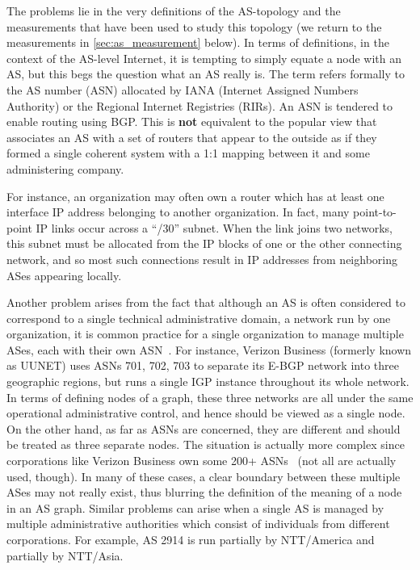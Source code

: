 The problems lie in the very definitions of the AS-topology and the
measurements that have been used to study this topology (we return to
the measurements in \autoref{sec:as_measurement} below).  In terms of
definitions, in the context of the AS-level Internet, it is tempting
to simply equate a node with an AS, but this begs the question what an
AS really is.  The term refers formally to the AS number (ASN)
allocated by IANA (Internet Assigned Numbers Authority) or the
Regional Internet Registries (RIRs). An ASN is tendered to enable
routing using BGP.  This is {\bf not} equivalent to the popular view
that associates an AS with a set of routers that appear to the outside
as if they formed a single coherent system with a 1:1 mapping between
it and some administering company.

For instance, an organization may often own a router which has at least one 
interface IP address belonging to another organization. In fact, many point-to-point 
IP links occur across a ``/30'' subnet. When the link joins two networks, this subnet 
must be allocated from the IP blocks of one or the other connecting network, and so 
most such connections result in IP addresses from neighboring ASes appearing locally. 

Another problem arises from the fact that although an AS is often considered to 
correspond to a single technical administrative domain, \ie a network run by one 
organization, it is common practice for a single organization to manage multiple 
ASes, each with their own ASN~\cite{cai10:_AS_to_organ_map}. For instance, Verizon 
Business (formerly known as UUNET) uses ASNs 701, 702, 703 to separate its
E-BGP network into three geographic regions, but runs a single IGP instance throughout 
its whole network. In terms of defining nodes of a graph, these three networks are all 
under the same operational administrative control, and hence should be viewed as a 
single node. On the other hand, as far as ASNs are concerned, they are different and 
should be treated as three separate nodes.  The situation is actually more complex 
since corporations like Verizon Business own some 200+ ASNs~\cite{cai10:_AS_to_organ_map} 
(not all are actually used, though). In many of these cases, a clear boundary between 
these multiple ASes may not really exist, thus blurring the definition of
the meaning of a node in an AS graph. Similar problems can arise when a single AS 
is managed by multiple administrative authorities which consist of individuals 
from different corporations. For example, AS 2914 is run partially by NTT/America 
and partially by NTT/Asia.

